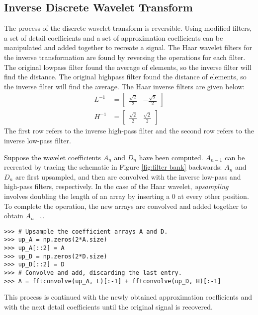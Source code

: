 \subsection*{Inverse Discrete Wavelet Transform}

The process of the discrete wavelet transform is reversible.
Using modified filters, a set of detail coefficients and a set of approximation coefficients can be manipulated and added together to recreate a signal.
The Haar wavelet filters for the inverse transformation are found by reversing the operations for each filter.
The original lowpass filter found the average of elements, so the inverse filter will find the distance.
The original highpass filter found the distance of elements, so the inverse filter will find the average.
The Haar inverse filters are given below:
\begin{align*}
L^{-1} &= \begin{bmatrix}\frac{\sqrt{2}}{2} & -\frac{\sqrt{2}}{2}\end{bmatrix}\\H^{-1}&=\begin{bmatrix}\frac{\sqrt{2}}{2}&\frac{\sqrt{2}}{2}\end{bmatrix}
\end{align*}
The first row refers to the inverse high-pass filter and the second row refers to the inverse low-pass filter.

Suppose the wavelet coefficients $A_n$ and $D_n$ have been computed.
$A_{n-1}$ can be recreated by tracing the schematic in Figure \ref{fig:filter bank} backwards: $A_n$ and $D_n$ are first upsampled, and then are convolved with the inverse low-pass and high-pass filters, respectively.
In the case of the Haar wavelet, \emph{upsampling} involves doubling the length of an array by inserting a 0 at every other position.
To complete the operation, the new arrays are convolved and added together to obtain $A_{n-1}$.

\begin{lstlisting}
>>> # Upsample the coefficient arrays A and D.
>>> up_A = np.zeros(2*A.size)
>>> up_A[::2] = A
>>> up_D = np.zeros(2*D.size)
>>> up_D[::2] = D
>>> # Convolve and add, discarding the last entry.
>>> A = fftconvolve(up_A, L)[:-1] + fftconvolve(up_D, H)[:-1]
\end{lstlisting}

This process is continued with the newly obtained approximation coefficients and with the next detail coefficients until the original signal is recovered.

